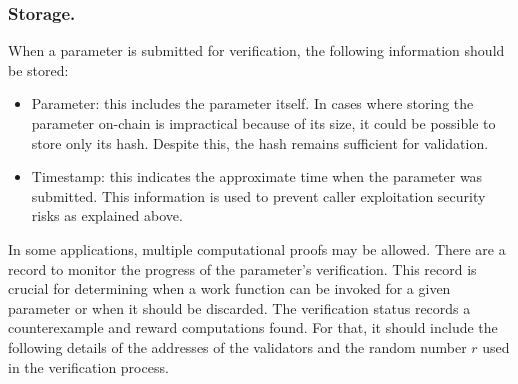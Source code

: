 \documentclass[runningheads]{llncs}
\begin{document}
\subsubsection{Storage.}
When a parameter is submitted for verification, the following information should be stored:
\begin{itemize}
\item Parameter: this includes the parameter itself. In cases where storing the parameter on-chain is impractical because of its size, it could be possible to store only its hash. Despite this, the hash remains sufficient for validation.
\item Timestamp: this indicates the approximate time when the parameter was submitted. This information is used to prevent caller exploitation security risks as explained above.
\end{itemize}

In some applications, multiple computational proofs may be allowed. There are a record to monitor the progress of the parameter's verification. This record is crucial for determining when a work function can be invoked for a given parameter or when it should be discarded. The verification status records a counterexample and reward computations found. For that, it should include the following details of the addresses of the validators and the random number $r$ used in the verification process.
\end{document}
